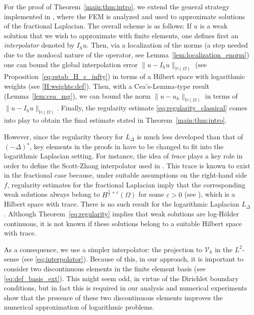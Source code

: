 \documentclass[11 pt]{article}
\numberwithin{equation}{section}
\def\eps{\varepsilon}
\begin{document}
 For the proof of Theorem~\ref{main:thm:intro}, we extend the general strategy implemented in \cite{Bor17}, where the FEM is analyzed and used to approximate solutions of the fractional Laplacian.  The overall scheme is as follows: If $u$ is a weak solution that we wish to approximate with finite elements, one defines first an \emph{interpolator} denoted by $I_h u$.  Then, via a localization of the norms (a step needed due to the nonlocal nature of the operator, see Lemma~\ref{lem:localization_enorm}) one can bound the global interpolation error $\|u-I_h u\|_{\mathbb H(\Omega)}$ (see Proposition~\ref{eq:estab_H_c_infty}) in terms of a Hilbert space with logarithmic weights (see \eqref{H:weights:def}).  Then, with a Cea's-Lemma-type result (Lemma~\ref{lem:cea_mg}), we can bound the norm $\|u-u_h\|_{\mathbb H(\Omega)}$ in terms of $\|u-I_h u\|_{\mathbb H(\Omega)}$.  Finally, the regularity estimate \eqref{eq:regularity_classical} comes into play to obtain the final estimate stated in Theorem~\ref{main:thm:intro}.

 However, since the regularity theory for $L_\Delta$ is much less developed than that of $(-\Delta)^s$, key elements in the proofs in \cite{Bor17} have to be changed to fit into the logarithmic Laplacian setting.  For instance, the idea of \emph{trace} plays a key role in order to define the Scott-Zhang interpolator used in \cite{Bor17}. This trace is known to exist in the fractional case because, under suitable assumptions on the right-hand side $f$, regularity estimates for the fractional Laplacian imply that the corresponding weak solutions always belong to $H^{\frac{1}{2}+\eps}(\Omega)$ for some $\eps>0$ (see \cite[Theorem 2.3.6]{Bor17}), which is a Hilbert space with trace.  There is no such result for the logarithmic Laplacian $L_\Delta$.  Although Theorem~\ref{eq:regularity} implies that weak solutions are log-Hölder continuous, it is not known if these solutions belong to a suitable Hilbert space with trace.

 As a consequence, we use a simpler interpolator: the projection to $\mathcal V_h$ in the $L^2$-sense (see \eqref{eq:interpolator}). Because of this, in our approach, it is important to consider two discontinuous elements in the finite element basis (see \eqref{eq:def_basis_ext}).  This might seem odd, in virtue of the Dirichlet boundary conditions, but in fact this is required in our analysis and numerical experiments show that the presence of these two discontinuous elements improves the numerical approximation of logarithmic problems.
\end{document}

